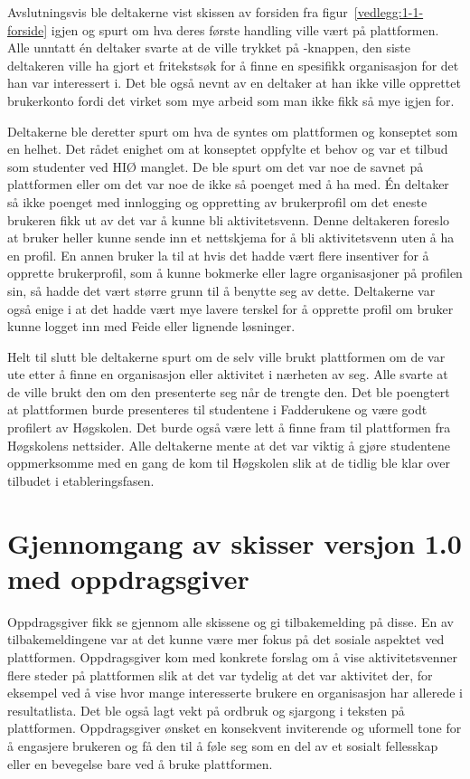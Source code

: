 Avslutningsvis ble deltakerne vist skissen av forsiden fra figur~\ref{vedlegg:1-1-forside} igjen og spurt om hva deres første handling ville vært på plattformen. Alle unntatt én deltaker svarte at de ville trykket på -knappen, den siste deltakeren ville ha gjort et fritekstsøk for å finne en spesifikk organisasjon for det han var interessert i. Det ble også nevnt av en deltaker at han ikke ville opprettet brukerkonto fordi det virket som mye arbeid som man ikke fikk så mye igjen for.

Deltakerne ble deretter spurt om hva de syntes om plattformen og konseptet som en helhet. Det rådet enighet om at konseptet oppfylte et behov og var et tilbud som studenter ved HIØ manglet. De ble spurt om det var noe de savnet på plattformen eller om det var noe de ikke så poenget med å ha med. Én deltaker så ikke poenget med innlogging og oppretting av brukerprofil om det eneste brukeren fikk ut av det var å kunne bli aktivitetsvenn. Denne deltakeren foreslo at bruker heller kunne sende inn et nettskjema for å bli aktivitetsvenn uten å ha en profil. En annen bruker la til at hvis det hadde vært flere insentiver for å opprette brukerprofil, som å kunne bokmerke eller lagre organisasjoner på profilen sin, så hadde det vært større grunn til å benytte seg av dette. Deltakerne var også enige i at det hadde vært mye lavere terskel for å opprette profil om bruker kunne logget inn med Feide eller lignende løsninger.

Helt til slutt ble deltakerne spurt om de selv ville brukt plattformen om de var ute etter å finne en organisasjon eller aktivitet i nærheten av seg. Alle svarte at de ville brukt den om den presenterte seg når de trengte den. Det ble poengtert at plattformen burde presenteres til studentene i Fadderukene og være godt profilert av Høgskolen. Det burde også være lett å finne fram til plattformen fra Høgskolens nettsider. Alle deltakerne mente at det var viktig å gjøre studentene oppmerksomme med en gang de kom til Høgskolen slik at de tidlig ble klar over tilbudet i etableringsfasen.

\section{Gjennomgang av skisser versjon 1.0 med oppdragsgiver}
\label{section:skisser1.0-oppdragsgiver}

Oppdragsgiver fikk se gjennom alle skissene og gi tilbakemelding på disse. En av tilbakemeldingene var at det kunne være mer fokus på det sosiale aspektet ved plattformen. Oppdragsgiver kom med konkrete forslag om å vise aktivitetsvenner flere steder på plattformen slik at det var tydelig at det var aktivitet der, for eksempel ved å vise hvor mange interesserte brukere en organisasjon har allerede i resultatlista. Det ble også lagt vekt på ordbruk og sjargong i teksten på plattformen. Oppdragsgiver ønsket en konsekvent inviterende og uformell tone for å engasjere brukeren og få den til å føle seg som en del av et sosialt fellesskap eller en bevegelse bare ved å bruke plattformen.


